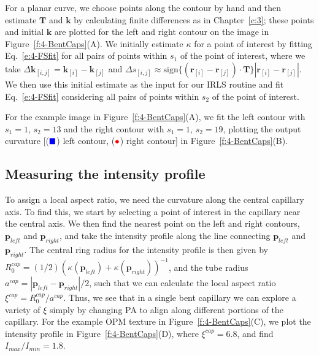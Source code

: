 For a planar curve, we choose points along the contour by hand and then estimate $\mathbf{T}$ and $\mathbf{k}$ by calculating finite differences as in Chapter~\ref{c:3}; these points and initial $\mathbf{k}$ are plotted for the left and right contour on the image in Figure~\ref{f:4-BentCaps}(A).
We initially estimate $\kappa$ for a point of interest by fitting Eq.~\ref{e:4-FSfit} for all pairs of points within $s_1$ of the point of interest, where we take $\Delta \mathbf{k}_{[i,j]} = \mathbf{k}_{[i]} - \mathbf{k}_{[j]}$ and $\Delta s_{[i,j]} \approx
\textrm{sign}\big \{ (\mathbf{r}_{[i]} - \mathbf{r}_{[j]}) \cdot \mathbf{T}\big \} |\mathbf{r}_{[i]} - \mathbf{r}_{[j]}|$.
We then use this initial estimate as the input for our IRLS routine and fit Eq.~\ref{e:4-FSfit} considering all pairs of points within $s_2$ of the point of interest.

For the example image in Figure~\ref{f:4-BentCaps}(A), we fit the left contour with $s_1 = 1$, $s_2 = 13$ and the right contour with $s_1 = 1$, $s_2 = 19$, plotting the output curvature [(${\color{blue} \blacksquare}$) left contour, (${\color{red} \bullet}$) right contour] in Figure~\ref{f:4-BentCaps}(B).

\subsection{Measuring the intensity profile}
To assign a local aspect ratio, we need the curvature along the central capillary axis.
To find this, we start by selecting a point of interest in the capillary near the central axis.
We then find the nearest point on the left and right contours, $\mathbf{p}_{left}$ and $\mathbf{p}_{right}$, and take the intensity profile along the line connecting $\mathbf{p}_{left}$ and $\mathbf{p}_{right}$.
The central ring radius for the intensity profile is then given by $R^{cap}_0 = (1/2)(\kappa(\mathbf{p}_{left}) + \kappa(\mathbf{p}_{right}))^{-1}$, and the tube radius $a^{cap} = |\mathbf{p}_{left} - \mathbf{p}_{right}|/2$, such that we can calculate the local aspect ratio $\xi^{cap} = R^{cap}_0/a^{cap}$.
Thus, we see that in a single bent capillary we can explore a variety of $\xi$ simply by changing PA to align along different portions of the capillary.
For the example OPM texture in Figure~\ref{f:4-BentCaps}(C), we plot the intensity profile in Figure~\ref{f:4-BentCaps}(D), where $\xi^{cap} = 6.8$, and find $I_{max}/I_{min} = 1.8$.


